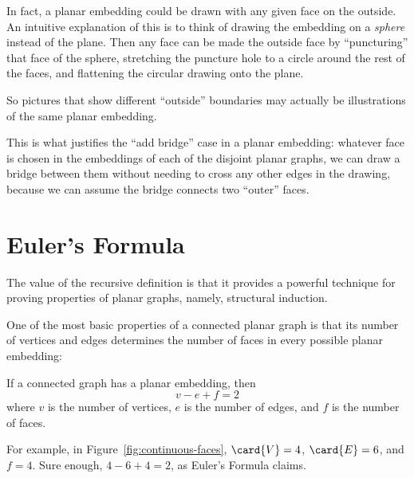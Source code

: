 In fact, a planar embedding could be drawn with any given face on the
outside.  An intuitive explanation of this is to think of drawing the
embedding on a \emph{sphere} instead of the plane.  Then any face can be
made the outside face by ``puncturing'' that face of the sphere,
stretching the puncture hole to a circle around the rest of the faces,
and flattening the circular drawing onto the plane.

So pictures that show different ``outside'' boundaries may actually be
illustrations of the same planar embedding.

This is what justifies the ``add bridge'' case in a planar embedding:
whatever face is chosen in the embeddings of each of the disjoint planar
graphs, we can draw a bridge between them without needing to cross any
other edges in the drawing, because we can assume the bridge connects
two ``outer'' faces.

\section{Euler's Formula}

The value of the recursive definition is that it provides a powerful
technique for proving properties of planar graphs, namely, structural
induction.

One of the most basic properties of a connected planar graph is that its
number of vertices and edges determines the number of faces in every
possible planar embedding:

\begin{theorem}
If a connected graph has a planar embedding, then
%
\[
v - e + f = 2
\]
%
where $v$ is the number of vertices, $e$ is the number of edges, and
$f$ is the number of faces.
\end{theorem}

For example, in Figure~\ref{fig:continuous-faces}, $\card{V} = 4$,
$\card{E} = 6$, and $f = 4$.  Sure enough, $4 - 6 + 4 = 2$, as Euler's
Formula claims.

